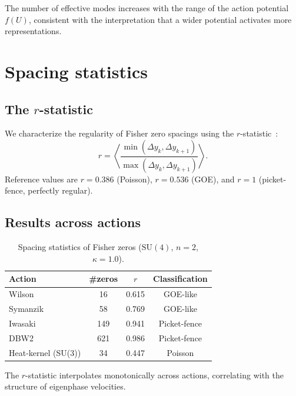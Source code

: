 \documentclass[12pt]{article}
\theoremstyle{definition}
\theoremstyle{remark}
\newcommand{\SU}{\mathrm{SU}}
\begin{document}
The number of effective modes increases with the range of the action
potential~$f(U)$, consistent with the interpretation that a wider
potential activates more representations.


\section{Spacing statistics}
\label{sec:statistics}

\subsection{The $r$-statistic}

We characterize the regularity of Fisher zero spacings using the
$r$-statistic~\cite{OganesyanHuse2007}:
\begin{equation}
r = \left\langle
\frac{\min(\Delta y_k, \Delta y_{k+1})}{\max(\Delta y_k, \Delta y_{k+1})}
\right\rangle.
\end{equation}
Reference values are $r = 0.386$ (Poisson), $r = 0.536$ (GOE), and
$r = 1$ (picket-fence, perfectly regular).

\subsection{Results across actions}

\begin{table}[h]
\centering
\caption{Spacing statistics of Fisher zeros ($\SU(4)$, $n = 2$,
  $\kappa = 1.0$).}
\label{tab:rstats}
\begin{tabular}{lccc}
\toprule
Action & \#zeros & $r$ & Classification \\
\midrule
Wilson   & 16  & 0.615 & GOE-like \\
Symanzik & 58  & 0.769 & GOE-like \\
Iwasaki  & 149 & 0.941 & Picket-fence \\
DBW2     & 621 & 0.986 & Picket-fence \\
\midrule
Heat-kernel (SU(3)) & 34 & 0.447 & Poisson \\
\bottomrule
\end{tabular}
\end{table}

The $r$-statistic interpolates monotonically across actions,
correlating with the structure of eigenphase velocities.
\end{document}
